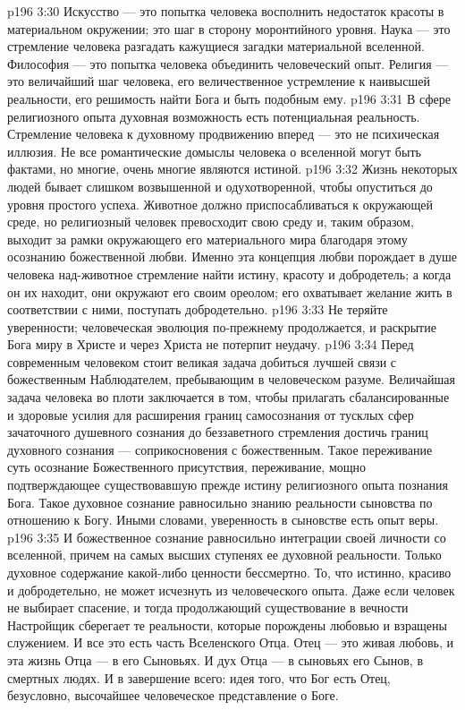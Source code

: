 \vs p196 3:30 \pc Искусство --- это попытка человека восполнить недостаток красоты в материальном окружении; это шаг в сторону моронтийного уровня. Наука --- это стремление человека разгадать кажущиеся загадки материальной вселенной. Философия --- это попытка человека объединить человеческий опыт. Религия --- это величайший шаг человека, его величественное устремление к наивысшей реальности, его решимость найти Бога и быть подобным ему.
\vs p196 3:31 \pc В сфере религиозного опыта духовная возможность есть потенциальная реальность. Стремление человека к духовному продвижению вперед --- это не психическая иллюзия. Не все романтические домыслы человека о вселенной могут быть фактами, но многие, очень многие являются истиной.
\vs p196 3:32 Жизнь некоторых людей бывает слишком возвышенной и одухотворенной, чтобы опуститься до уровня простого успеха. Животное должно приспосабливаться к окружающей среде, но религиозный человек превосходит свою среду и, таким образом, выходит за рамки окружающего его материального мира благодаря этому осознанию божественной любви. Именно эта концепция любви порождает в душе человека над\hyp{}животное стремление найти истину, красоту и добродетель; а когда он их находит, они окружают его своим ореолом; его охватывает желание жить в соответствии с ними, поступать добродетельно.
\vs p196 3:33 Не теряйте уверенности; человеческая эволюция по\hyp{}прежнему продолжается, и раскрытие Бога миру в Христе и через Христа не потерпит неудачу.
\vs p196 3:34 Перед современным человеком стоит великая задача добиться лучшей связи с божественным Наблюдателем, пребывающим в человеческом разуме. Величайшая задача человека во плоти заключается в том, чтобы прилагать сбалансированные и здоровые усилия для расширения границ самосознания от тусклых сфер зачаточного душевного сознания до беззаветного стремления достичь границ духовного сознания --- соприкосновения с божественным. Такое переживание суть осознание Божественного присутствия, переживание, мощно подтверждающее существовавшую прежде истину религиозного опыта познания Бога. Такое духовное сознание равносильно знанию реальности сыновства по отношению к Богу. Иными словами, уверенность в сыновстве есть опыт веры.
\vs p196 3:35 И божественное сознание равносильно интеграции своей личности со вселенной, причем на самых высших ступенях ее духовной реальности. Только духовное содержание какой\hyp{}либо ценности бессмертно. То, что истинно, красиво и добродетельно, не может исчезнуть из человеческого опыта. Даже если человек не выбирает спасение, и тогда продолжающий существование в вечности Настройщик сберегает те реальности, которые порождены любовью и взращены служением. И все это есть часть Вселенского Отца. Отец --- это живая любовь, и эта жизнь Отца --- в его Сыновьях. И дух Отца --- в сыновьях его Сынов, в смертных людях. И в завершение всего: идея того, что Бог есть Отец, безусловно, высочайшее человеческое представление о Боге.
\separatorline
